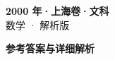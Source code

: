 \documentclass[zihao=-4, a4paper]{ctexart}
\begin{document}
\begin{center}
  {\Large\bfseries 2000 年·上海卷·文科}\\[4pt]
  {\large 数学 · 解析版}
\end{center}
\medskip
{}

\clearpage
{}
\begin{center}{\Large\bfseries 参考答案与详细解析}\end{center}
\medskip

\end{document}
